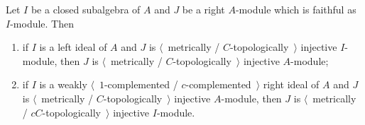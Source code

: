 \begin{proposition}\label{MetTopInjUnderChangeOfAlg} Let $I$ be a closed
subalgebra of $A$ and $J$ be a right $A$-module which is faithful as $I$-module.
Then

\begin{enumerate}[label = (\roman*)]
    \item if $I$ is a left ideal of $A$ and $J$ is $\langle$~metrically /
    $C$-topologically~$\rangle$  injective $I$-module, then $J$ is
    $\langle$~metrically / $C$-topologically~$\rangle$ injective $A$-module;

    \item if $I$ is a weakly $\langle$~$1$-complemented /
    $c$-complemented~$\rangle$ right ideal of $A$ and $J$ is
    $\langle$~metrically / $C$-topologically~$\rangle$ injective $A$-module,
    then $J$ is $\langle$~metrically / $cC$-topologically~$\rangle$ injective
    $I$-module.
\end{enumerate}
\end{proposition}
